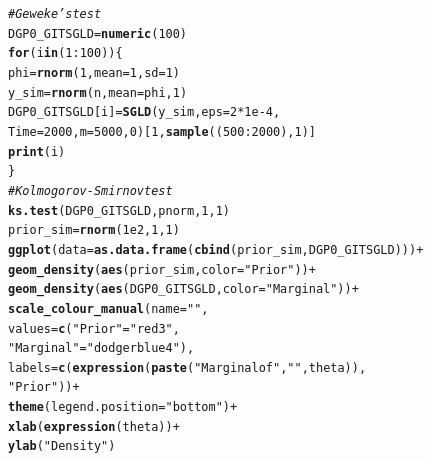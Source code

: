 \documentclass[11pt,a4paper]{report}\usepackage[]{graphicx}\usepackage[]{color}
\makeatletter
\newcommand{\hlnum}[1]{\textcolor[rgb]{0.686,0.059,0.569}{#1}}%
\newcommand{\hlstr}[1]{\textcolor[rgb]{0.192,0.494,0.8}{#1}}%
\newcommand{\hlcom}[1]{\textcolor[rgb]{0.678,0.584,0.686}{\textit{#1}}}%
\newcommand{\hlopt}[1]{\textcolor[rgb]{0,0,0}{#1}}%
\newcommand{\hlstd}[1]{\textcolor[rgb]{0.345,0.345,0.345}{#1}}%
\newcommand{\hlkwa}[1]{\textcolor[rgb]{0.161,0.373,0.58}{\textbf{#1}}}%
\newcommand{\hlkwb}[1]{\textcolor[rgb]{0.69,0.353,0.396}{#1}}%
\newcommand{\hlkwc}[1]{\textcolor[rgb]{0.333,0.667,0.333}{#1}}%
\newcommand{\hlkwd}[1]{\textcolor[rgb]{0.737,0.353,0.396}{\textbf{#1}}}%
\newenvironment{kframe}{%
 \def\at@end@of@kframe{}%
 \ifinner\ifhmode%
  \def\at@end@of@kframe{\end{minipage}}%
  \begin{minipage}{\columnwidth}%
 \fi\fi%
 \def\FrameCommand##1{\hskip\@totalleftmargin \hskip-\fboxsep
 \colorbox{shadecolor}{##1}\hskip-\fboxsep
     \hskip-\linewidth \hskip-\@totalleftmargin \hskip\columnwidth}%
 \MakeFramed {\advance\hsize-\width
   \@totalleftmargin\z@ \linewidth\hsize
   \@setminipage}}%
 {\par\unskip\endMakeFramed%
 \at@end@of@kframe}
\newenvironment{knitrout}{}{} %
\makeatother
\begin{document}
\begin{appendix}
\begin{knitrout}
\begin{kframe}
\begin{alltt}
\hlcom{#Geweke's test}
\hlstd{DGP0_GITSGLD}\hlkwb{=}\hlkwd{numeric}\hlstd{(}\hlnum{100}\hlstd{)}
\hlkwa{for} \hlstd{(i} \hlkwa{in} \hlstd{(}\hlnum{1}\hlopt{:}\hlnum{100}\hlstd{)) \{}
  \hlstd{phi}\hlkwb{=}\hlkwd{rnorm}\hlstd{(}\hlnum{1}\hlstd{,}\hlkwc{mean}\hlstd{=}\hlnum{1}\hlstd{,}\hlkwc{sd}\hlstd{=}\hlnum{1}\hlstd{)}
  \hlstd{y_sim}\hlkwb{=}\hlkwd{rnorm}\hlstd{(n,}\hlkwc{mean} \hlstd{= phi,}\hlnum{1}\hlstd{)}
  \hlstd{DGP0_GITSGLD[i]}\hlkwb{=}\hlkwd{SGLD}\hlstd{(y_sim,} \hlkwc{eps}\hlstd{=}\hlnum{2}\hlopt{*}\hlnum{1e-4}\hlstd{,}
                       \hlkwc{Time}\hlstd{=}\hlnum{2000}\hlstd{,}\hlkwc{m}\hlstd{=}\hlnum{5000}\hlstd{,}\hlnum{0}\hlstd{)[}\hlnum{1}\hlstd{,}\hlkwd{sample}\hlstd{((}\hlnum{500}\hlopt{:}\hlnum{2000}\hlstd{),}\hlnum{1}\hlstd{)]}
  \hlkwd{print}\hlstd{(i)}
\hlstd{\}}
\hlcom{#Kolmogorov-Smirnov test}
\hlkwd{ks.test}\hlstd{(DGP0_GITSGLD,pnorm,}\hlnum{1}\hlstd{,}\hlnum{1}\hlstd{)}
\hlstd{prior_sim}\hlkwb{=}\hlkwd{rnorm}\hlstd{(}\hlnum{1e2}\hlstd{,}\hlnum{1}\hlstd{,}\hlnum{1}\hlstd{)}
\hlkwd{ggplot}\hlstd{(}\hlkwc{data}\hlstd{=}\hlkwd{as.data.frame}\hlstd{(}\hlkwd{cbind}\hlstd{(prior_sim,DGP0_GITSGLD)))}\hlopt{+}
  \hlkwd{geom_density}\hlstd{(}\hlkwd{aes}\hlstd{(prior_sim,} \hlkwc{color}\hlstd{=}\hlstr{"Prior"}\hlstd{))}\hlopt{+}
  \hlkwd{geom_density}\hlstd{(}\hlkwd{aes}\hlstd{(DGP0_GITSGLD,}\hlkwc{color}\hlstd{=}\hlstr{"Marginal"}\hlstd{))}\hlopt{+}
  \hlkwd{scale_colour_manual}\hlstd{(}\hlkwc{name}\hlstd{=}\hlstr{""}\hlstd{,}
                      \hlkwc{values}\hlstd{=}\hlkwd{c}\hlstd{(}\hlstr{"Prior"}\hlstd{=}\hlstr{"red3"}\hlstd{,}
                               \hlstr{"Marginal"}\hlstd{=}\hlstr{"dodgerblue4"}\hlstd{),}
                      \hlkwc{labels}\hlstd{=}\hlkwd{c}\hlstd{(}\hlkwd{expression}\hlstd{(}\hlkwd{paste}\hlstd{(}\hlstr{"Marginal of"}\hlstd{,} \hlstr{" "}\hlstd{, theta)),}
                               \hlstr{"Prior"}\hlstd{))}\hlopt{+}
  \hlkwd{theme}\hlstd{(}\hlkwc{legend.position}\hlstd{=}\hlstr{"bottom"}\hlstd{)}\hlopt{+}
  \hlkwd{xlab}\hlstd{(}\hlkwd{expression}\hlstd{(theta))}\hlopt{+}
  \hlkwd{ylab}\hlstd{(}\hlstr{"Density"}\hlstd{)}
\end{alltt}
\end{kframe}
\end{knitrout}
 

\end{appendix}
\end{document}
